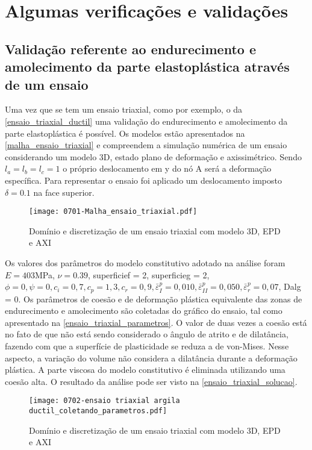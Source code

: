 \chapter{Algumas verificações e validações}\label{Algumas_verificacoes_validacoes}

\section{Validação referente ao endurecimento e amolecimento da parte elastoplástica através de um ensaio}

Uma vez que se tem um ensaio triaxial, como por exemplo, o da \autoref{ensaio_triaxial_ductil} uma validação do endurecimento e amolecimento da parte elastoplástica é possível. Os modelos estão apresentados na \autoref{malha_ensaio_triaxial} e compreendem a simulação numérica de um ensaio considerando um modelo 3D, estado plano de deformação e axissimétrico. Sendo $l_a = l_b = l_c = 1$ o próprio deslocamento em y do nó A será a deformação específica. Para representar o ensaio foi aplicado um deslocamento imposto $\delta = 0.1$ na face superior.

\begin{figure}[H]
	\begin{center}
		\texttt{[image: 0701-Malha\_ensaio\_triaxial.pdf]}
	\end{center}
	\caption{\label{malha_ensaio_triaxial}Domínio e discretização de um ensaio triaxial com modelo 3D, EPD e AXI}
\end{figure}

Os valores dos parâmetros do modelo constitutivo adotado na análise foram $E = 403$MPa, $\nu = 0.39$,  superficief = 2, superficieg = 2, $\phi = 0, \psi = 0, c_i = 0,7, c_p = 1,3, c_r = 0,9, \bar \varepsilon^p_{I} = 0,010, \bar \varepsilon^p_{II} = 0,050, \bar \varepsilon^p_{r} = 0,07$, Dalg = 0. Os parâmetros de coesão e de deformação plástica equivalente das zonas de endurecimento e amolecimento são coletadas do gráfico do ensaio, tal como apresentado na \autoref{ensaio_triaxial_parametros}. O valor de duas vezes a coesão está no fato de que não está sendo considerado o ângulo de atrito e de dilatância, fazendo com que a superfície de plasticidade se reduza a de von-Mises. Nesse aspecto, a variação do volume não considera a dilatância durante a deformação plástica. A parte viscosa do modelo constitutivo é eliminada utilizando uma coesão alta. O resultado da análise pode ser visto na \autoref{ensaio_triaxial_solucao}.
 
\begin{figure}[H]
 	\begin{center}
 		\texttt{[image: 0702-ensaio triaxial argila ductil\_coletando\_parametros.pdf]}
 	\end{center}
 	\caption{\label{ensaio_triaxial_parametros}Domínio e discretização de um ensaio triaxial com modelo 3D, EPD e AXI}
\end{figure}


